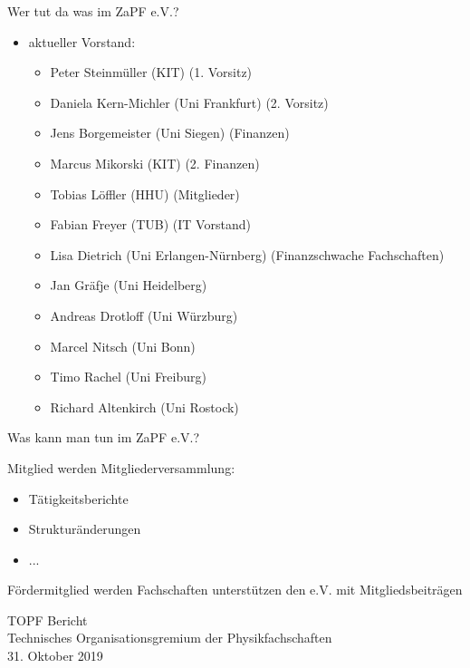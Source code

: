 \documentclass[compress, aspectratio=169]{beamer}
\begin{document}
\thispagestyle{empty}
\begin{frame}{Wer tut da was im ZaPF e.V.?}
    \begin{itemize}
        \item[] aktueller Vorstand:
        \begin{itemize}
             \item Peter Steinmüller (KIT) (1. Vorsitz)
             \item Daniela Kern-Michler (Uni Frankfurt) (2. Vorsitz)
             \item Jens Borgemeister (Uni Siegen) (Finanzen)
             \item Marcus Mikorski (KIT) (2. Finanzen)
             \item Tobias Löffler (HHU) (Mitglieder)
             \item Fabian Freyer (TUB) (IT Vorstand)
             \item Lisa Dietrich (Uni Erlangen-Nürnberg)  (Finanzschwache Fachschaften)
             \item Jan Gräfje (Uni Heidelberg)
             \item Andreas Drotloff (Uni Würzburg)
             \item Marcel Nitsch (Uni Bonn)
             \item Timo Rachel (Uni Freiburg)
             \item Richard Altenkirch (Uni Rostock)
        \end{itemize}
    \end{itemize}
\end{frame}

\thispagestyle{empty}
\begin{frame}{Was kann man tun im ZaPF e.V.?}
  \begin{block}{Mitglied werden}
    Mitgliederversammlung:
    \begin{itemize}
      \item Tätigkeitsberichte
      \item Strukturänderungen
      \item ...
    \end{itemize}
  \end{block}
\pause
  \begin{block}{Fördermitglied werden}
  Fachschaften unterstützen den e.V. mit Mitgliedsbeiträgen
  \end{block}
\end{frame}

\thispagestyle{empty}
\begin{frame}
  \begin{center}
    \Large{ TOPF Bericht }\\
    \vspace{1cm}
    \large Technisches Organisationsgremium der Physikfachschaften\\
    \vspace{0.5cm}
    \normalsize 31. Oktober 2019
  \end{center}
\end{frame}
\end{document}
